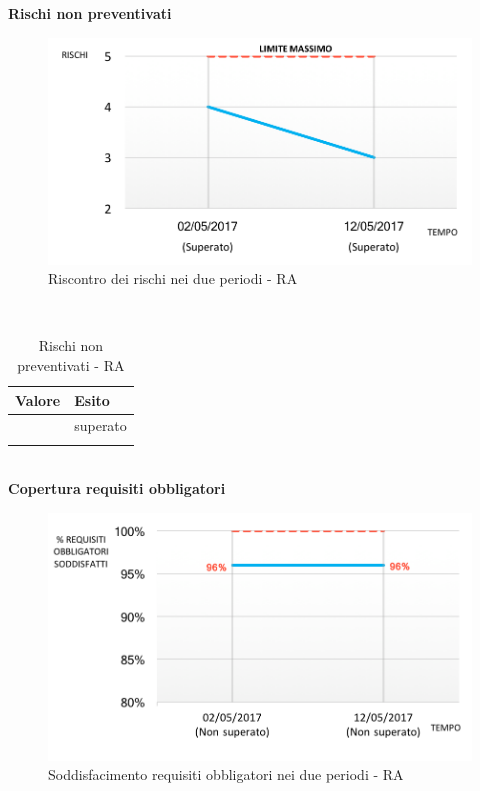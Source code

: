 \documentclass[../PianoDiQualifica_v4.0.0.tex]{subfiles}
\begin{document}
		\textbf{Rischi non preventivati}
		\begin{figure}[!h]
			\centering
			\includegraphics{grafici/Rischi.png}
			\caption{Riscontro dei rischi nei due periodi - RA}
			\label{fig:rischi}
		\end{figure}\mbox{}\\

		\begin{longtable}[c] { >{\centering\arraybackslash}p{3cm} >{\centering\arraybackslash}p{3cm} }
			\toprule
					\textbf{Valore} & \textbf{Esito} \\
				\midrule
					3 & superato \\
				\bottomrule
			\caption{Rischi non preventivati - RA}
		\end{longtable}\mbox{}\\

		\textbf{Copertura requisiti obbligatori}
		\begin{figure}[!h]
			\centering
			\includegraphics{grafici/Requisiti.png}
			\caption{Soddisfacimento requisiti obbligatori nei due periodi - RA}
			\label{fig:requisiti}
		\end{figure}\mbox{}\\
\end{document}
